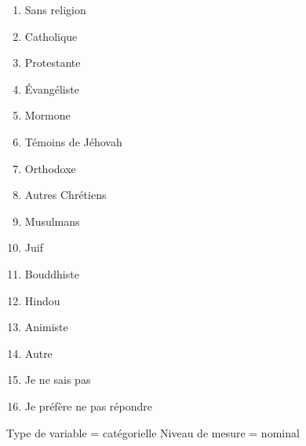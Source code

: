 \documentclass[
]{article}
\providecommand{\tightlist}{%
  \setlength{\itemsep}{0pt}\setlength{\parskip}{0pt}}
\begin{document}
\begin{enumerate}
\def\labelenumi{\arabic{enumi}.}
\setcounter{enumi}{-1}
\tightlist
\item
  Sans religion
\item
  Catholique
\item
  Protestante
\item
  Évangéliste
\item
  Mormone
\item
  Témoins de Jéhovah
\item
  Orthodoxe
\item
  Autres Chrétiens
\item
  Musulmans
\item
  Juif
\item
  Bouddhiste
\item
  Hindou
\item
  Animiste
\item
  Autre
\item
  Je ne sais pas
\item
  Je préfère ne pas répondre
\end{enumerate}

Type de variable = catégorielle Niveau de mesure = nominal
\end{document}
